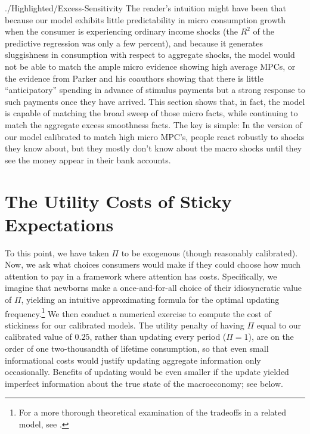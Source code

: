 \begin{verbatimwrite}{./Highlighted/Excess-Sensitivity}
The reader's intuition might have been that because our model exhibits little predictability in micro consumption growth when the consumer is experiencing ordinary income shocks (the $R^{2}$ of the predictive regression was only a few percent), and because it generates sluggishness in consumption with respect to aggregate shocks, the model would not be able to match the ample micro evidence showing high average MPCs, or the evidence from Parker and his coauthors showing that there is little ``anticipatory'' spending in advance of stimulus payments but a strong response to such payments once they have arrived.  This section shows that, in fact, the model is capable of matching the broad sweep of those micro facts, while continuing to match the aggregate excess smoothness facts.  The key is simple: In the version of our model calibrated to match high micro MPC's, people react robustly to shocks they know about, but they mostly don't know about the macro shocks until they see the money appear in their bank accounts.

\end{verbatimwrite}



\hypertarget{Utility-Costs-Of-Sticky-Expectations}{}
\section{The Utility Costs of Sticky Expectations}\label{sec:uCost}

To this point, we have taken $\Pi$ to be exogenous (though reasonably calibrated).  Now, we ask what choices consumers would make if they could choose how much attention to pay in a framework where attention has costs.  Specifically, we imagine that newborns make a once-and-for-all choice of their idiosyncratic value of $\Pi$, yielding an intuitive approximating formula for the optimal updating frequency.\footnote{For a more thorough theoretical examination of the tradeoffs in a related model, see \cite{reis:inattentive}.}  We then conduct a numerical exercise to compute the cost of stickiness for our calibrated models.  The utility penalty of having $\Pi$ equal to our calibrated value of $0.25$, rather than updating every period ($\Pi=1$), are on the order of one two-thousandth of lifetime consumption, so that even small informational costs would justify updating aggregate information only occasionally.  Benefits of updating would be even smaller if the update yielded imperfect information about the true state of the macroeconomy; see below.

